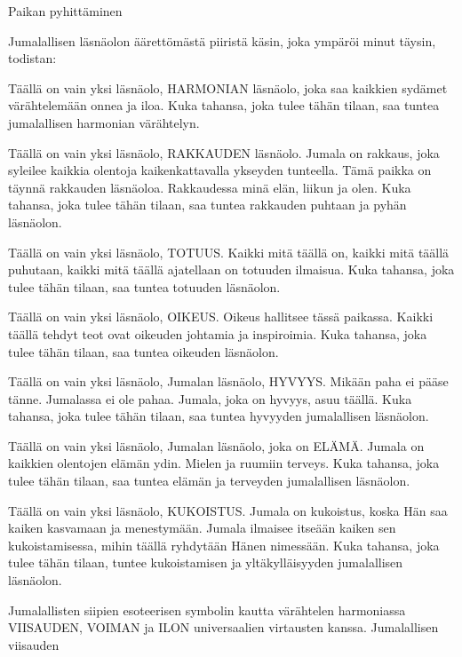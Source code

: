   \begin{passage}[FI]{Paikan pyhittäminen}
    \par
    Jumalallisen läsnäolon äärettömästä piiristä käsin,
    joka ympäröi minut täysin, todistan:
    \par
    Täällä on vain yksi läsnäolo, HARMONIAN läsnäolo,
    joka saa kaikkien sydämet värähtelemään  onnea ja
    iloa. Kuka tahansa, joka tulee tähän tilaan, saa
    tuntea jumalallisen harmonian värähtelyn.
    \par
    Täällä on vain yksi läsnäolo, RAKKAUDEN läsnäolo.
    Jumala on rakkaus, joka syleilee kaikkia olentoja
    kaikenkattavalla ykseyden tunteella. Tämä paikka on
    täynnä rakkauden läsnäoloa. Rakkaudessa minä elän,
    liikun ja olen. Kuka tahansa, joka tulee tähän tilaan,
    saa tuntea rakkauden puhtaan ja pyhän läsnäolon.
    \par
    Täällä on vain yksi läsnäolo, TOTUUS. Kaikki mitä
    täällä on, kaikki mitä täällä puhutaan, kaikki mitä
    täällä ajatellaan on totuuden ilmaisua. Kuka tahansa,
    joka tulee tähän tilaan, saa tuntea totuuden läsnäolon.
    \par
    Täällä on vain yksi läsnäolo, OIKEUS. Oikeus hallitsee
    tässä paikassa. Kaikki täällä tehdyt teot ovat oikeuden
    johtamia ja inspiroimia. Kuka tahansa, joka tulee tähän
    tilaan, saa tuntea oikeuden läsnäolon.
    \par
    Täällä on vain yksi läsnäolo, Jumalan läsnäolo, HYVYYS.
    Mikään paha ei pääse tänne. Jumalassa ei ole pahaa.
    Jumala, joka on hyvyys, asuu täällä. Kuka tahansa, joka
    tulee tähän tilaan, saa tuntea hyvyyden jumalallisen
    läsnäolon.
    \par
    Täällä on vain yksi läsnäolo, Jumalan läsnäolo, joka on
    ELÄMÄ. Jumala on kaikkien olentojen elämän ydin.
    Mielen ja ruumiin terveys. Kuka tahansa, joka tulee
    tähän tilaan, saa tuntea elämän ja terveyden jumalallisen
    läsnäolon.
    \par
    Täällä on vain yksi läsnäolo, KUKOISTUS. Jumala on kukoistus,
    koska Hän saa kaiken kasvamaan ja menestymään.
    Jumala ilmaisee itseään kaiken sen kukoistamisessa,
    mihin täällä ryhdytään Hänen nimessään. Kuka tahansa,
    joka tulee tähän tilaan, tuntee kukoistamisen ja
    yltäkylläisyyden jumalallisen läsnäolon.
    \par
    Jumalallisten siipien esoteerisen symbolin kautta
    värähtelen harmoniassa VIISAUDEN, VOIMAN ja ILON
    universaalien virtausten kanssa. Jumalallisen viisauden

\end{passage}
